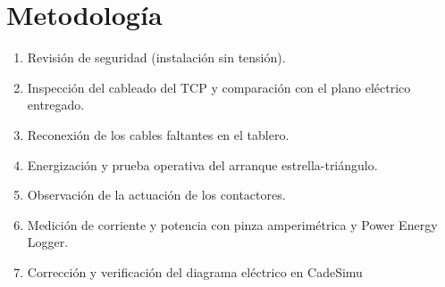 \section{Metodología}
\begin{enumerate}
    \item Revisión de seguridad (instalación sin tensión).
    \item Inspección del cableado del TCP y comparación con el plano eléctrico entregado.
    \item Reconexión de los cables faltantes en el tablero.
    \item Energización y prueba operativa del arranque estrella-triángulo.
    \item Observación de la actuación de los contactores.
    \item Medición de corriente y potencia con pinza amperimétrica y Power Energy Logger.
      \item Corrección y verificación del diagrama eléctrico en CadeSimu 
\end{enumerate}

